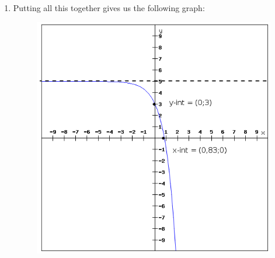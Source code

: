 {\begin{mdframed}[linewidth=4, leftmargin=40, rightmargin=40]
\begin{exercise}
\begin{enumerate}[noitemsep, label=\textbf{Step} \textbf{\arabic*}. ]
{\begin{minipage}{\columnwidth}
    \parbox[t]{\mymathboxwidth}{\large$
    y=-2.{3}^{x}+50=-2.{3}^{x}+5-5=-2.{3}^{x}{3}^{{x}_{\mathrm{int}}}=\frac{5}{2}{x}_{\mathrm{int}}=0,83$}\hfill
    \parbox[t]{48pt}{\raggedleft 
    (1.42)}
    \end{minipage}\vspace{12pt}\par
    }%
So there is one x-intercept at $\left(0,83,0\right)$.\item Putting all this together gives us the following graph:
    \setcounter{subfigure}{0}
	\begin{figure}[H] %
    \begin{center}
    \label{m39348*uid12329!!!underscore!!!media}\label{m39348*uid123279!!!underscore!!!printimage}\includegraphics[width=0.6\columnwidth]{col11306.imgs/m39348_exponent1.png} %
      \vspace{2pt}
    \vspace{.1in}
    \end{center}
 \end{figure}       
\end{enumerate}
    \end{exercise}
    \end{mdframed}
    }
    \noindent
\label{m39348*secfhsst!!!underscore!!!id4260}
